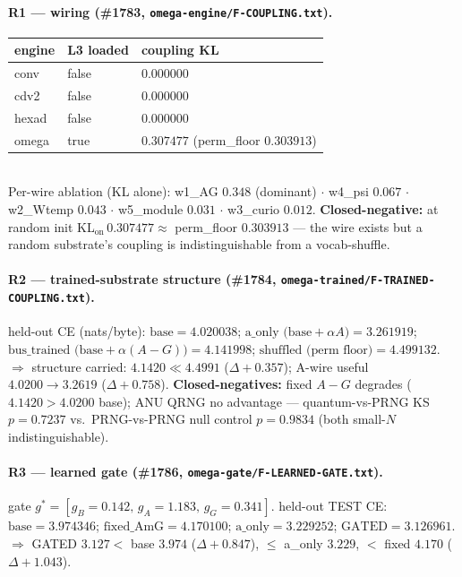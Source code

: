 \documentclass[11pt]{article}
\begin{document}
\paragraph{R1 --- wiring (\#1783, \texttt{omega-engine/F-COUPLING.txt}).}
\begin{tabular}{lll}
\toprule
engine & L3 loaded & coupling KL \\
\midrule
conv  & false & $0.000000$ \\
cdv2  & false & $0.000000$ \\
hexad & false & $0.000000$ \\
omega & true  & $0.307477$ \quad (perm\_floor $0.303913$) \\
\bottomrule
\end{tabular}\\
Per-wire ablation (KL alone): w1\_AG $0.348$ (dominant) $\cdot$ w4\_psi $0.067$ $\cdot$
w2\_Wtemp $0.043$ $\cdot$ w5\_module $0.031$ $\cdot$ w3\_curio $0.012$.
\textbf{Closed-negative:} at random init KL$_\text{on}\,0.307477 \approx$ perm\_floor $0.303913$
--- the wire exists but a random substrate's coupling is indistinguishable from a vocab-shuffle.

\paragraph{R2 --- trained-substrate structure (\#1784,
\texttt{omega-trained/F-TRAINED-COUPLING.txt}).} held-out CE (nats/byte):
$\text{base}=4.020038$; $\text{a\_only (base}+\alpha A)=3.261919$;
$\text{bus\_trained (base}+\alpha(A{-}G))=4.141998$; $\text{shuffled (perm floor)}=4.499132$.
$\Rightarrow$ structure carried: $4.1420 \ll 4.4991$ ($\Delta{+}0.357$); A-wire useful
$4.0200\rightarrow3.2619$ ($\Delta{+}0.758$). \textbf{Closed-negatives:} fixed $A{-}G$ degrades
($4.1420 > 4.0200$ base); ANU QRNG no advantage --- quantum-vs-PRNG KS $p=0.7237$ vs.\
PRNG-vs-PRNG null control $p=0.9834$ (both small-$N$ indistinguishable).

\paragraph{R3 --- learned gate (\#1786, \texttt{omega-gate/F-LEARNED-GATE.txt}).}
gate $g^\ast=[g_B{=}0.142,\,g_A{=}1.183,\,g_G{=}0.341]$. held-out TEST CE:
$\text{base}=3.974346$; $\text{fixed\_AmG}=4.170100$; $\text{a\_only}=3.229252$;
$\text{GATED}=3.126961$. $\Rightarrow$ GATED $3.127 <$ base $3.974$ ($\Delta{+}0.847$),
$\le$ a\_only $3.229$, $<$ fixed $4.170$ ($\Delta{+}1.043$).
\end{document}
